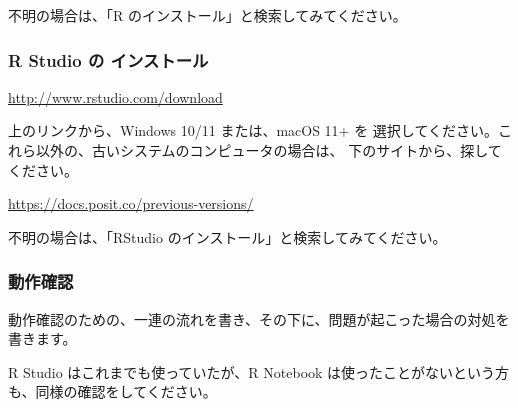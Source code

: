 \documentclass[
]{bxjsbook}
\theoremstyle{definition}
\theoremstyle{definition}
\theoremstyle{definition}
\theoremstyle{definition}
\theoremstyle{remark}
\begin{document}
不明の場合は、「R のインストール」と検索してみてください。

\hypertarget{r-studio-ux306e-ux30a4ux30f3ux30b9ux30c8ux30fcux30eb}{%
\subsubsection{R Studio の インストール}\label{r-studio-ux306e-ux30a4ux30f3ux30b9ux30c8ux30fcux30eb}}

\url{http://www.rstudio.com/download}

上のリンクから、Windows 10/11 または、macOS 11+ を 選択してください。これら以外の、古いシステムのコンピュータの場合は、 下のサイトから、探してください。

\url{https://docs.posit.co/previous-versions/}

不明の場合は、「RStudio のインストール」と検索してみてください。

\hypertarget{ux52d5ux4f5cux78baux8a8d}{%
\subsubsection{動作確認}\label{ux52d5ux4f5cux78baux8a8d}}

動作確認のための、一連の流れを書き、その下に、問題が起こった場合の対処を書きます。

R Studio はこれまでも使っていたが、R Notebook は使ったことがないという方も、同様の確認をしてください。
\end{document}
